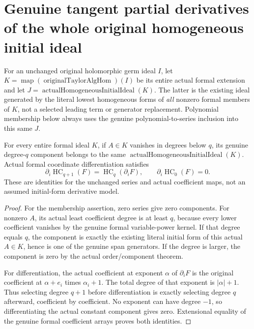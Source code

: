 \section{Genuine tangent partial derivatives of the whole original homogeneous initial ideal}

For an unchanged original holomorphic germ ideal $I$, let
$K=\operatorname{map}(\operatorname{originalTaylorAlgHom})(I)$ be
its entire actual formal extension and let
$J=\operatorname{actualHomogeneousInitialIdeal}(K)$. The latter is
the existing ideal generated by the literal lowest homogeneous forms
of \emph{all} nonzero formal members of $K$, not a selected leading
term or generator replacement. Polynomial membership below always
uses the genuine polynomial-to-series inclusion into this same $J$.

\begin{theorem}
\label{hir:actual-homogeneous-initial-component-derivative-dictionaries}
\leanok
For every entire formal ideal $K$, if $A\in K$ vanishes in degrees
below $q$, its genuine degree-$q$ component belongs to the same
$\operatorname{actualHomogeneousInitialIdeal}(K)$. Actual formal
coordinate differentiation satisfies
\[
 \partial_i\operatorname{HC}_{q+1}(F)
    =\operatorname{HC}_q(\partial_i F),\qquad
 \partial_i\operatorname{HC}_0(F)=0.
\]
These are identities for the unchanged series and actual coefficient
maps, not an assumed initial-form derivative model.
\end{theorem}
\begin{proof}
For the membership assertion, zero series give zero components. For
nonzero $A$, its actual least coefficient degree is at least $q$,
because every lower coefficient vanishes by the genuine formal
variable-power kernel. If that degree equals $q$, the component is
exactly the existing literal initial form of this actual $A\in K$,
hence is one of the genuine span generators. If the degree is
larger, the component is zero by the actual order/component theorem.

For differentiation, the actual coefficient at exponent $\alpha$ of
$\partial_i F$ is the original coefficient at
$\alpha+e_i$ times $\alpha_i+1$. The total degree of that exponent is
$|\alpha|+1$. Thus selecting degree $q+1$ before differentiation is
exactly selecting degree $q$ afterward, coefficient by coefficient.
No exponent can have degree $-1$, so differentiating the actual
constant component gives zero. Extensional equality of the genuine
formal coefficient arrays proves both identities.
\end{proof}

